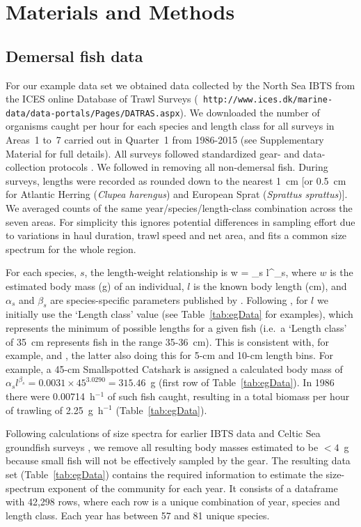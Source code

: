 \section{Materials and Methods}

\subsection{Demersal fish data}

For our example data set
we obtained data collected by the North Sea IBTS from the ICES online Database
of Trawl Surveys ({\tt
  http://www.ices.dk/marine-data/data-portals/Pages/DATRAS.aspx}).
We downloaded the number of
organisms caught per hour for each species and
length class for all surveys in Areas~1 to~7 carried out in Quarter~1
from 1986-2015 (see Supplementary Material for full details).
All surveys followed standardized
gear- and data-collection protocols \citep{ices15}.
We followed
\citet{ffrr12} in removing all non-demersal fish.
During surveys, lengths were recorded as rounded
down to the nearest 1~cm [or 0.5~cm for Atlantic Herring (\emph{Clupea
  harengus}) and European Sprat (\emph{Sprattus sprattus})].
We averaged counts of the same year/species/length-class combination
across the seven areas.
For simplicity this ignores potential differences in
sampling effort due to variations in haul duration, trawl speed and net area,
and fits a common size spectrum for the whole region.

For each species, $s$, the length-weight relationship is
\eb
w = \alpha_s l^{\beta_s},
\label{lw}
\ee
where $w$ is the estimated body mass (g) of an individual, $l$ is the known
body length (cm), and $\alpha_s$ and $\beta_s$ are species-specific parameters
published by \citet{ffrr12}. Following \citet{ffrr12}, for $l$ we initially use
the `Length class' value (see
Table~\ref{tab:egData} for examples), which represents the minimum of possible
lengths for a given fish (i.e.~a `Length class' of 35~cm represents fish in the
range 35-36~cm). This is consistent with, for example, \citet{blan05} and
\citet{dgpr05}, the latter also doing this for 5-cm and 10-cm length
bins. For example, a 45-cm Smallspotted Catshark is assigned a calculated
body mass of $\alpha_s l^ {\beta_s} = 0.0031 \times 45^{3.0290} = 315.46$~g
(first row of Table~\ref{tab:egData}). In 1986 there were 0.00714~h$^{-1}$ of such fish caught,
resulting in a total biomass per hour of trawling of
2.25~g~h$^{-1}$ (Table~\ref{tab:egData}).

Following calculations of size spectra for earlier IBTS data \citep{pj05} and
Celtic Sea groundfish surveys \citep{blan05}, we remove all resulting body
masses estimated to be $<4$~g because small fish will not be effectively sampled by
the gear. The resulting data set (Table~\ref{tab:egData}) contains the required
information to estimate the size-spectrum exponent of the community for each
year. It consists of a dataframe with 42,298 rows, where each row is a unique
combination of year, species and length class. Each year has between 57 and 81
unique species.

